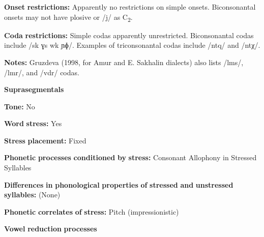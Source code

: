 \begin{styleBody}
\textbf{Onset} \textbf{restrictions:} Apparently no restrictions on simple onsets. Biconsonantal onsets may not have plosive or /j/ as C\textsubscript{2}.
\end{styleBody}

\begin{styleBody}
\textbf{Coda} \textbf{restrictions:} Simple codas apparently unrestricted. Biconsonantal codas include /sk ɣs wk ɲɸ/. Examples of triconsonantal codas include /ntq/ and /ntχ/.
\end{styleBody}

\begin{styleBody}
\textbf{Notes:} Gruzdeva (1998, for Amur and E. Sakhalin dialects) also lists /lms/, /lmr/, and /vdr/ codas.
\end{styleBody}

\begin{styleBody}
\textbf{Suprasegmentals}
\end{styleBody}

\begin{styleBody}
\textbf{Tone:} No
\end{styleBody}

\begin{styleBody}
\textbf{Word} \textbf{stress:} Yes
\end{styleBody}

\begin{styleBody}
\textbf{Stress} \textbf{placement:} Fixed
\end{styleBody}

\begin{styleBody}
\textbf{Phonetic} \textbf{processes} \textbf{conditioned} \textbf{by} \textbf{stress:} Consonant Allophony in Stressed Syllables
\end{styleBody}

\begin{styleBody}
\textbf{Differences} \textbf{in} \textbf{phonological} \textbf{properties} \textbf{of} \textbf{stressed} \textbf{and} \textbf{unstressed} \textbf{syllables:} (None)
\end{styleBody}

\begin{styleBody}
\textbf{Phonetic} \textbf{correlates} \textbf{of} \textbf{stress:} Pitch (impressionistic)
\end{styleBody}

\begin{styleBody}
\textbf{Vowel} \textbf{reduction} \textbf{processes}
\end{styleBody}

